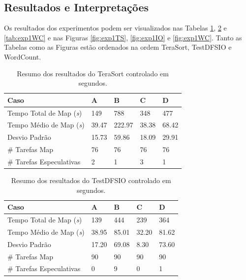 \subsection{Resultados e Interpretações}
Os resultados dos experimentos podem ser visualizados nas Tabelas \ref{tab:exp1TS}, \ref{tab:exp1IO} e \ref{tab:exp1WC} e nas Figuras \ref{fig:exp1TS}, \ref{fig:exp1IO} e \ref{fig:exp1WC}. Tanto as Tabelas como as Figuras estão ordenados na ordem TeraSort, TestDFSIO e WordCount. 

\begin{table}[h!]
	\caption{Resumo dos resultados do TeraSort controlado em segundos.} \label{tab:exp1TS}
	\begin{tabular*}{\hsize}{lllll} %
		\textbf{Caso} & \textbf{A} & \textbf{B} & \textbf{C} & \textbf{D}\\
		\hline
		Tempo Total de Map ({\it{s}}) & 149 & 788 & 348 & 477 \\
		Tempo Médio de Map ({\it{s}}) & 39.47 & 222.97 & 38.38 & 68.42 \\
		Desvio Padrão & 15.73 & 59.86 & 18.09 & 29.91 \\
		\# Tarefas Map & 76 & 76 & 76 & 76 \\
		\# Tarefas Especulativas & 2 & 1 & 3 & 1 \\
	\end{tabular*}
\end{table}

\begin{table}[h!]
	\caption{Resumo dos resultados do TestDFSIO controlado em segundos.} \label{tab:exp1IO}
	\begin{tabular*}{\hsize}{lllll} %
		\textbf{Caso} & \textbf{A} & \textbf{B} & \textbf{C} & \textbf{D}\\
		\hline
		Tempo Total de Map ({\it{s}}) & 139 & 444 & 239 & 364 \\
		Tempo Médio de Map ({\it{s}}) & 38.95 & 85.01 & 32.20 & 81.62 \\
		Desvio Padrão & 17.20 & 69.08 & 8.30 & 73.60 \\
		\# Tarefas Map & 90 & 90 & 90 & 90 \\
		\# Tarefas Especulativas & 0 & 9 & 0 & 1 \\
	\end{tabular*}
\end{table}


